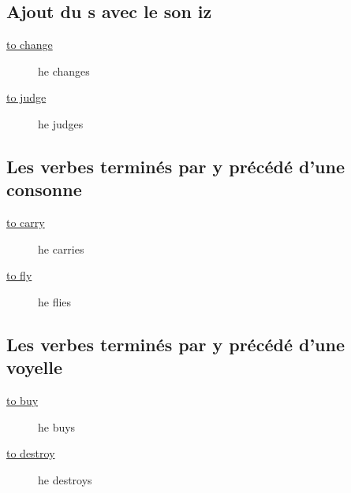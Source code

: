 \documentclass[12pt,4]{article}
\begin{document}
\subsection{Ajout du s avec le son iz}
\label{sec:orgee2fcc8}\begin{description}
\item[{\href{https://fr.bab.la/conjugaison/anglais/change}{to change}}] he changes
\item[{\href{https://fr.bab.la/conjugaison/anglais/judge}{to judge}}] he judges
\end{description}
\subsection{Les verbes terminés par y précédé d'une consonne}
\label{sec:org8062a1c}
\begin{description}
\item[{\href{https://fr.bab.la/conjugaison/anglais/carry}{to carry}}] he carries
\item[{\href{https://fr.bab.la/conjugaison/anglais/fly}{to fly}}] he flies
\end{description}
\subsection{Les verbes terminés par y précédé d'une voyelle}
\label{sec:org1606ffb}
\begin{description}
\item[{\href{https://fr.bab.la/conjugaison/anglais/buy}{to buy}}] he buys
\item[{\href{https://fr.bab.la/conjugaison/anglais/destroy}{to destroy}}] he destroys
\end{description}
\end{document}
